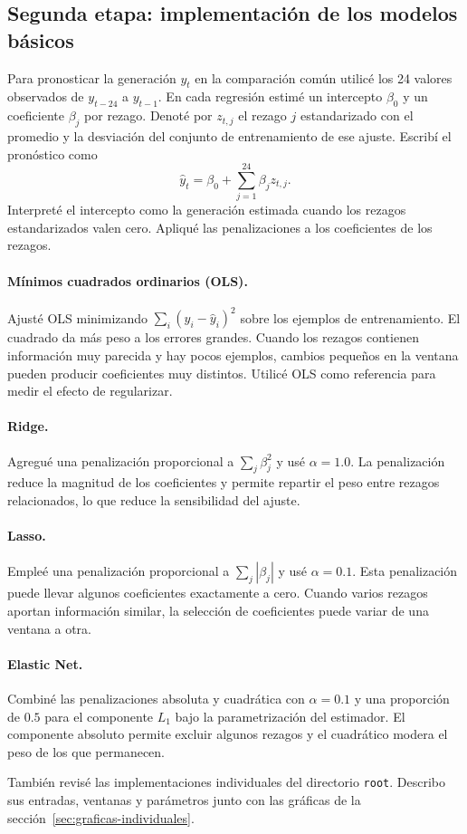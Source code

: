 \subsection{Segunda etapa: implementación de los modelos básicos}

Para pronosticar la generación $y_t$ en la comparación común utilicé los 24 valores observados de $y_{t-24}$ a $y_{t-1}$. En cada regresión estimé un intercepto $\beta_0$ y un coeficiente $\beta_j$ por rezago. Denoté por $z_{t,j}$ el rezago $j$ estandarizado con el promedio y la desviación del conjunto de entrenamiento de ese ajuste. Escribí el pronóstico como
\[
  \widehat y_t = \beta_0 + \sum_{j=1}^{24}\beta_j z_{t,j}.
\]
Interpreté el intercepto como la generación estimada cuando los rezagos estandarizados valen cero. Apliqué las penalizaciones a los coeficientes de los rezagos.

\paragraph{Mínimos cuadrados ordinarios (OLS).}

Ajusté OLS minimizando $\sum_i (y_i-\widehat y_i)^2$ sobre los ejemplos de entrenamiento. El cuadrado da más peso a los errores grandes. Cuando los rezagos contienen información muy parecida y hay pocos ejemplos, cambios pequeños en la ventana pueden producir coeficientes muy distintos. Utilicé OLS como referencia para medir el efecto de regularizar.

\paragraph{Ridge.}

Agregué una penalización proporcional a $\sum_j\beta_j^2$ y usé $\alpha=1.0$. La penalización reduce la magnitud de los coeficientes y permite repartir el peso entre rezagos relacionados, lo que reduce la sensibilidad del ajuste.

\paragraph{Lasso.}

Empleé una penalización proporcional a $\sum_j |\beta_j|$ y usé $\alpha=0.1$. Esta penalización puede llevar algunos coeficientes exactamente a cero. Cuando varios rezagos aportan información similar, la selección de coeficientes puede variar de una ventana a otra.

\paragraph{Elastic Net.}

Combiné las penalizaciones absoluta y cuadrática con $\alpha=0.1$ y una proporción de $0.5$ para el componente $L_1$ bajo la parametrización del estimador. El componente absoluto permite excluir algunos rezagos y el cuadrático modera el peso de los que permanecen.

También revisé las implementaciones individuales del directorio \texttt{root}. Describo sus entradas, ventanas y parámetros junto con las gráficas de la sección~\ref{sec:graficas-individuales}.